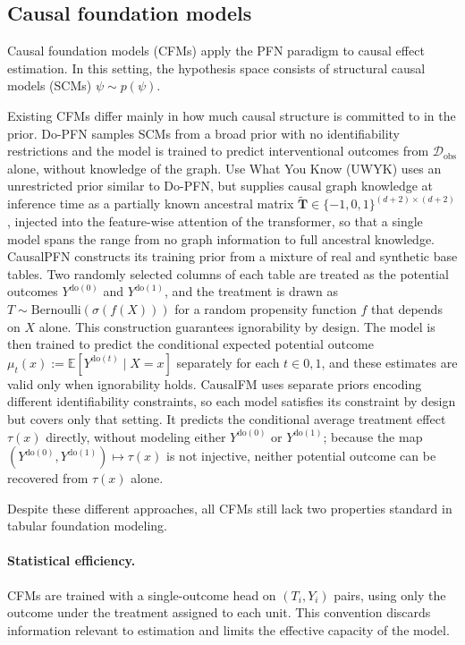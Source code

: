 \documentclass[11pt]{article}
\begin{document}
\subsection{Causal foundation models}
\label{sec:cfm}
Causal foundation models (CFMs) apply the PFN paradigm to causal effect estimation. In this setting, the hypothesis space consists of structural causal models (SCMs) $\psi \sim p(\psi)$.

Existing CFMs differ mainly in how much causal structure is committed to in the prior. Do-PFN \citep{dopfn} samples SCMs from a broad prior with no identifiability restrictions and the model is trained to predict interventional outcomes from $\mathcal{D}_{\text{obs}}$ alone, without knowledge of the graph. 
Use What You Know (UWYK) \citep{uwyk} uses an unrestricted prior similar to Do-PFN, but supplies causal graph knowledge at inference time as a partially known ancestral matrix $\tilde{\mathbf{T}} \in \{-1,0,1\}^{(d+2) \times (d+2)}$, injected into the feature-wise attention of the transformer, so that a single model spans the range from no graph information to full ancestral knowledge. CausalPFN \citep{causalpfn} constructs its training prior from a mixture of real and synthetic base tables. Two randomly selected columns of each table are treated as the potential outcomes $Y^{\mathrm{do}(0)}$ and $Y^{\mathrm{do}(1)}$, and the treatment is drawn as $T \sim \mathrm{Bernoulli}(\sigma(f(X)))$ for a random propensity function $f$ that depends on $X$ alone. This construction guarantees ignorability by design. The model is then trained to predict the conditional expected potential outcome $\mu_t(x) := \mathbb{E}[Y^{\mathrm{do}(t)} \mid X = x]$ separately for each $t \in {0, 1}$, and these estimates are valid only when ignorability holds. CausalFM \citep{ma2026causalfm} uses separate priors encoding different identifiability constraints, so each model satisfies its constraint by design but covers only that setting. It predicts the conditional average treatment effect $\tau(x)$ directly, without modeling either $Y^{\mathrm{do}(0)}$ or $Y^{\mathrm{do}(1)}$; because the map $(Y^{\mathrm{do}(0)}, Y^{\mathrm{do}(1)}) \mapsto \tau(x)$ is not injective, neither potential outcome can be recovered from $\tau(x)$ alone.

Despite these different approaches, all CFMs still lack two properties standard in tabular foundation modeling.

\paragraph{Statistical efficiency.}
CFMs \citep{dopfn, uwyk, causalpfn} are trained with a single-outcome head on $(T_i, Y_i)$ pairs, using only the outcome under the treatment assigned to each unit. This convention discards information relevant to estimation and limits the effective capacity of the model.
\end{document}

